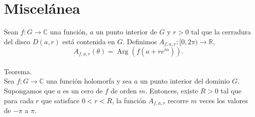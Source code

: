 \section{Miscelánea}
Sean $f\colon G\to\mathbb{C}$ una función,
$a$ un punto interior de $G$
y $r>0$ tal que la cerradura del disco $D(a,r)$ está contenida en $G$.
Definimos $A_{f,a,r}\colon[0,2\pi)\to\mathbb{R}$,
\[
A_{f,a,r}(\theta) = \operatorname{Arg}(f(a+re^{i\alpha})).
\]
\\
Teorema.
\\
Sea $f\colon G\to\mathbb{C}$ una función holomorfa
y sea $a$ un punto interior del dominio $G$.
Supongamos que $a$ es un cero de $f$ de orden $m$.
Entonces, existe $R>0$ tal que para cada $r$ que satisface $0<r<R$,
la función $A_{f,a,r}$ recorre $m$ veces los valores de $-\pi$ a $\pi$.







